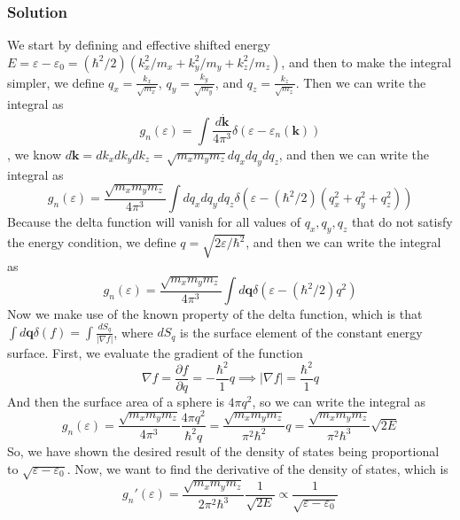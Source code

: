 \documentclass[12pt]{article}
\begin{document}
\subsubsection{Solution}
We start by defining and effective shifted energy
$E= \varepsilon - \varepsilon_0 = \left(\hbar^2 / 2\right)\left(k_x^2 / m_x+k_y^2 / m_y+k_z^2 / m_z\right)$, and then to make the integral simpler, we define $q_x = \frac{k_x}{\sqrt{m_x}}$, $q_y = \frac{k_y}{\sqrt{m_y}}$, and $q_z = \frac{k_z}{\sqrt{m_z}}$. Then we can write the integral as
$$
g_n(\varepsilon)=\int \frac{d \dot{\mathbf{k}}}{4 \pi^3} \delta\left(\varepsilon-\varepsilon_n(\mathbf{k})\right)
$$
, we know $d \mathbf{k} = dk_x dk_y dk_z = \sqrt{m_x m_y m_z} dq_x dq_y dq_z$, and then we can write the integral as
\begin{equation}
g_n(\varepsilon) = \frac{\sqrt{m_x m_y m_z}}{4 \pi^3}\int dq_x dq_y dq_z \delta\left(\varepsilon-\left(\hbar^2 / 2\right)\left(q_x^2 + q_y^2 + q_z^2\right)\right)
\end{equation}
Because the delta function will vanish for all values of $q_x, q_y, q_z$ that do not satisfy the energy condition, we define $q = \sqrt{2\varepsilon/\hbar^2}$, and then we can write the integral as
\begin{equation}
g_n(\varepsilon) = \frac{\sqrt{m_x m_y m_z}}{4 \pi^3}\int d\mathbf{q} \delta\left(\varepsilon-\left(\hbar^2 / 2\right)q^2\right)
\end{equation}
Now we make use of the known property of the delta function, which is that $\int d\mathbf{q} \delta\left(f\right) = \int \frac{dS_q}{|\nabla f|}$, where $dS_q$ is the surface element of the constant energy surface. First, we evaluate the gradient of the function
\begin{equation}
\nabla f = \frac{\partial f}{\partial q} = -\frac{\hbar^2}{1}q \implies |\nabla f| = \frac{\hbar^2}{1}q
\end{equation}
And then the surface area of a sphere is $4\pi q^2$, so we can write the integral as
\begin{equation}
g_n(\varepsilon) = \frac{\sqrt{m_x m_y m_z}}{4 \pi^3}\frac{4\pi q^2}{\hbar^2 q} = \frac{\sqrt{m_x m_y m_z}}{\pi^2 \hbar^2}q = \frac{\sqrt{m_x m_y m_z}}{\pi^2 \hbar^3}\sqrt{2E}
\end{equation}
So, we have shown the desired result of the density of states being proportional to $\sqrt{\varepsilon - \varepsilon_0}$. Now, we want to find the derivative of the density of states, which is
\begin{equation}
g_n'(\varepsilon) = \frac{\sqrt{m_x m_y m_z}}{2\pi^2 \hbar^3}\frac{1}{\sqrt{2E}} \propto \frac{1}{\sqrt{\varepsilon - \varepsilon_0}}
\end{equation}
\end{document}
